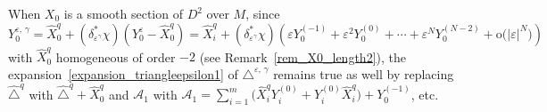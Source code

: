 \documentclass[10pt]{amsart}
\theoremstyle{definition}\newtheorem{defi}[theo]{Definition}\newtheorem{rema}[theo]{Remark}\newtheorem{exam}[theo]{Example}\newtheorem{exem}[theo]{Example}\newtheorem{nota}[theo]{Notation}
\newcommand{\calA}{\mathcal{A}}
\newcommand{\rmo}{\mathrm{o}}
\begin{document}

When $X_0$ is a smooth section of $D^2$ over $M$, since $Y_0^{\varepsilon,\,\gamma} = \widehat{X}_0^{q} + (\delta _{\varepsilon^\gamma}^*\chi) (Y_0^\varepsilon-\widehat{X}_0^{q}) = \widehat{X}_i^{q} + (\delta _{\varepsilon^\gamma}^*\chi) (\varepsilon Y_0^{(-1)} + \varepsilon^2 Y_0^{(0)} + \cdots + \varepsilon^N Y_0^{(N-2)} + \rmo\big(\vert\varepsilon\vert^N\big))$ with $\widehat{X}_0^{q}$ homogeneous of order $-2$ (see Remark~\ref{rem_X0_length2}), the expansion~\eqref{expansion_triangleepsilon1} of $\triangle^{\varepsilon,\,\gamma}$ remains true as well by replacing $\widehat{\triangle}^{q}$ with $\widehat{\triangle}^{q} +\widehat{X}_0^{q}$ and $\calA_1$ with $\calA_1 = \sum_{i=1}^m \big(\widehat{X}^{q}_i Y^{(0)}_i + Y^{(0)}_i \widehat{X}^{q}_i \big) + Y^{(-1)}_0$, etc.

\end{document}
